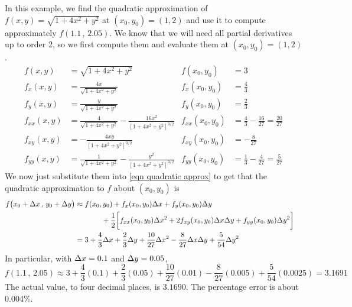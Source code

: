 \begin{eg}\label{eg approx C}
In this example, we find the quadratic approximation of 
$f(x,y)=\sqrt{1+4x^2+y^2}$ at $(x_0,y_0)=(1,2)$ and use it to compute
approximately $f(1.1\,,\,2.05)$. We know that we will need all 
partial derivatives up to order 2, so we first compute them
and evaluate them at $(x_0,y_0)=(1,2)$.
\begin{align*}
f(x,y)&=\sqrt{1+4x^2+y^2} &
      f(x_0,y_0)&=3 \\
f_x(x,y)&=\frac{4x}{\sqrt{1+4x^2+y^2}} &
      f_x(x_0,y_0)&=\frac{4}{3} \\
f_y(x,y)&=\frac{y}{\sqrt{1+4x^2+y^2}} &
      f_y(x_0,y_0)&=\frac{2}{3} \\
f_{xx}(x,y)&=\frac{4}{\sqrt{1+4x^2+y^2}} -\frac{16x^2}{[1+4x^2+y^2]^{3/2}} &
      f_{xx}(x_0,y_0)&=\frac{4}{3} -\frac{16}{27}=\frac{20}{27}\\
f_{xy}(x,y)&=-\frac{4xy}{[1+4x^2+y^2]^{3/2}} &
      f_{xy}(x_0,y_0)&= -\frac{8}{27}\\
f_{yy}(x,y)&=\frac{1}{\sqrt{1+4x^2+y^2}} -\frac{y^2}{[1+4x^2+y^2]^{3/2}} &
      f_{yy}(x_0,y_0)&=\frac{1}{3} -\frac{4}{27}=\frac{5}{27} 
\end{align*}
We now just substitute them into \eqref{eqn quadratic approx} to get 
that the quadratic approximation to $f$ about $(x_0,y_0)$ is
\begin{align*}
f\big(x_0+\Delta x\,,\,y_0+\Delta y\big)
& \approx f(x_0, y_0)
        +f_x(x_0, y_0)\Delta x+f_y(x_0, y_0)\Delta y \cr &\hskip0.5in
    +\frac{1}{2}\bigg[f_{xx}(x_0, y_0)\Delta x^2
              +2f_{xy}(x_0, y_0)\Delta x\Delta y
               +f_{yy}(x_0, y_0)\Delta y^2\bigg] \cr
& = 3 +\frac{4}{3} \Delta x+\frac{2}{3}\Delta y 
    +\frac{10}{27}\Delta x^2 -\frac{8}{27}\Delta x\Delta y+\frac{5}{54}\Delta y^2 \cr
\end{align*}
In particular, with $\Delta x=0.1$ and $\Delta y=0.05$,
\begin{equation*}
f(1.1\,,\,2.05)\approx 3 +\frac{4}{3} (0.1)+\frac{2}{3}(0.05) 
    +\frac{10}{27}(0.01) -\frac{8}{27}(0.005)+\frac{5}{54}(0.0025)
=3.1691%
\end{equation*}
The actual value, to four decimal places, is $3.1690$. %
The percentage error is about 0.004\%.

\end{eg}

